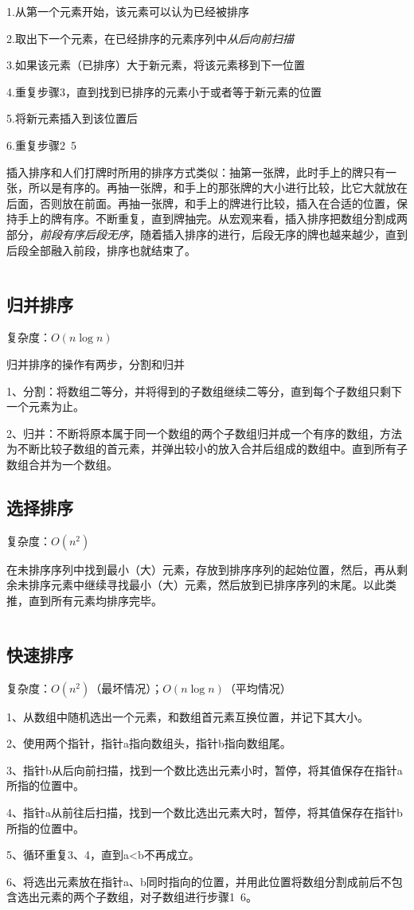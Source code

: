 1.从第一个元素开始，该元素可以认为已经被排序

2.取出下一个元素，在已经排序的元素序列中\textit{从后向前扫描}

3.如果该元素（已排序）大于新元素，将该元素移到下一位置

4.重复步骤3，直到找到已排序的元素小于或者等于新元素的位置

5.将新元素插入到该位置后

6.重复步骤2~5

插入排序和人们打牌时所用的排序方式类似：抽第一张牌，此时手上的牌只有一张，所以是有序的。再抽一张牌，和手上的那张牌的大小进行比较，比它大就放在后面，否则放在前面。再抽一张牌，和手上的牌进行比较，插入在合适的位置，保持手上的牌有序。不断重复，直到牌抽完。从宏观来看，插入排序把数组分割成两部分，\textit{前段有序后段无序}，随着插入排序的进行，后段无序的牌也越来越少，直到后段全部融入前段，排序也就结束了。

\inputminted{c++}{code/algorithm/insert_sort.cpp}

\subsection{归并排序}

复杂度：$ O(n\log n) $

归并排序的操作有两步，分割和归并

1、分割：将数组二等分，并将得到的子数组继续二等分，直到每个子数组只剩下一个元素为止。

2、归并：不断将原本属于同一个数组的两个子数组归并成一个有序的数组，方法为不断比较子数组的首元素，并弹出较小的放入合并后组成的数组中。直到所有子数组合并为一个数组。

\subsection{选择排序}

复杂度：$ O(n^2) $

在未排序序列中找到最小（大）元素，存放到排序序列的起始位置，然后，再从剩余未排序元素中继续寻找最小（大）元素，然后放到已排序序列的末尾。以此类推，直到所有元素均排序完毕。

\inputminted{cpp}{code/algorithm/select_sort.cpp}

\subsection{快速排序}

复杂度：$ O(n^2) $（最坏情况）；$ O(n\log n) $（平均情况）

1、从数组中随机选出一个元素，和数组首元素互换位置，并记下其大小。

2、使用两个指针，指针a指向数组头，指针b指向数组尾。

3、指针b从后向前扫描，找到一个数比选出元素小时，暂停，将其值保存在指针a所指的位置中。

4、指针a从前往后扫描，找到一个数比选出元素大时，暂停，将其值保存在指针b所指的位置中。

5、循环重复3、4，直到a<b不再成立。

6、将选出元素放在指针a、b同时指向的位置，并用此位置将数组分割成前后不包含选出元素的两个子数组，对子数组进行步骤1~6。